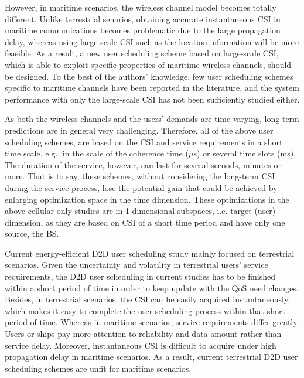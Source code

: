 \documentclass{ieeeaccess}
\begin{document}

However, in maritime scenarios, the wireless channel model becomes totally different. Unlike terrestrial senarios, obtaining accurate instantaneous CSI in maritime communications becomes problematic due to the large propagation delay, whereas using large-scale CSI such as the location information will be more feasible. As a result, a new user scheduling scheme based on large-scale CSI, which is able to exploit specific properties of maritime wireless channels, should be designed. To the best of the authors' knowledge, few user scheduling schemes specific to maritime channels have been reported in the literature, and the system performance with only the large-scale CSI has not been sufficiently studied either. 

As both the wireless channels and the users' demands are time-varying, long-term predictions are in general very challenging. Therefore, all of the above user scheduling schemes, are based on the CSI and service requirements in a short time scale, e.g., in the scale of the coherence time ($\mu$s) or several time slots (ms). The duration of the service, however, can last for several seconds, minutes or more. That is to say, these schemes, without considering the long-term CSI during the service process, lose the potential gain that could be achieved by enlarging optimization space in the time dimension. These optimizations in the above cellular-only studies are in 1-dimensional subspaces, i.e. target (user) dimension, as they are based on CSI of a short time period and have only one source, the BS. 

Current energy-efficient D2D user scheduling study mainly focused on terrestrial scenarios. Given the uncertainty and volatility in terrestrial users' service requirements, the D2D user scheduling in current studies has to be finished within a short period of time in order to keep update with the QoS need changes. Besides, in terrestrial scenarios, the CSI can be easily acquired instantaneously, which makes it easy to complete the user scheduling process within that short period of time. 
Whereas in maritime scenarios, service requirements differ greatly. Users or ships pay more attention to reliability and data amount rather than service delay. Moreover, instantaneous CSI is difficult to acquire under high propagation delay in maritime scenarios. As a result, current terrestrial D2D user scheduling schemes are unfit for maritime scenarios. 
\end{document}
